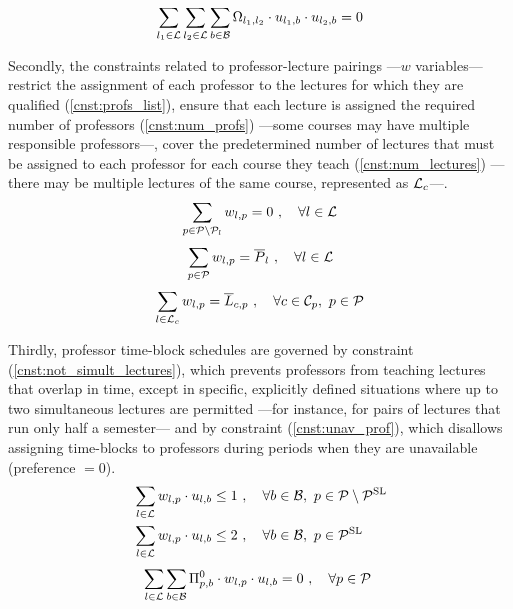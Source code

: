 \begin{equation}
    \sum_{l_1\in\mathcal{L}} \sum_{l_2\in\mathcal{L}}\sum_{b\in\mathcal{B}} \Omega_{l_1,l_2} \cdot u_{l_1,b} \cdot u_{l_2,b} = 0
    \label{cnst:overlap}
\end{equation}

Secondly, the constraints related to professor-lecture pairings ---$w$ variables--- restrict the assignment of each professor to the lectures for which they are qualified (\ref{cnst:profs_list}), ensure that each lecture is assigned the required number of professors (\ref{cnst:num_profs}) ---some courses may have multiple responsible professors---, cover the predetermined number of lectures that must be assigned to each professor for each course they teach (\ref{cnst:num_lectures}) ---there may be multiple lectures of the same course, represented as $\mathcal{L}_c$---.
\begin{equation}
    \sum_{p\in\profs\setminus\profs_l} w_{l,p} = 0 \ , \quad \forall l\in\lectures
    \label{cnst:profs_list}
\end{equation}
\begin{equation}
    \sum_{p\in\mathcal{P}} w_{l,p} = \overline{P}_l \ , \quad \forall l\in\mathcal{L}
    \label{cnst:num_profs}
\end{equation}
\begin{equation}
    \sum_{l\in\mathcal{L}_c} w_{l,p} = \overline{L}_{c,p} \ , \quad \forall c\in\mathcal{C}_p, \ p \in \mathcal{P}
    \label{cnst:num_lectures}
\end{equation}

Thirdly, professor time-block schedules are governed by constraint (\ref{cnst:not_simult_lectures}), which prevents professors from teaching lectures that overlap in time, except in specific, explicitly defined situations where up to two simultaneous lectures are permitted —for instance, for pairs of lectures that run only half a semester— and by constraint (\ref{cnst:unav_prof}), which disallows assigning time-blocks to professors during periods when they are unavailable (preference $=0$).
 \begin{equation}
 \begin{split}
    &\sum_{l\in\mathcal{L}} w_{l,p} \cdot u_{l,b} \leq 1 \ , \quad \forall b\in\mathcal{B}, \ p \in \mathcal{P}\setminus\mathcal{P}^\text{SL} \\
    &\sum_{l\in\mathcal{L}} w_{l,p} \cdot u_{l,b} \leq 2 \ , \quad \forall b\in\mathcal{B}, \ p \in \mathcal{P}^\text{SL}
 \end{split}
    \label{cnst:not_simult_lectures}
\end{equation}
\begin{equation}
    \sum_{l\in\mathcal{L}} \sum_{b \in \mathcal{B}} \Pi^0_{p,b} \cdot w_{l,p} \cdot u_{l,b} = 0 \ , \quad \forall p\in\mathcal{P}\
    \label{cnst:unav_prof}
\end{equation}

